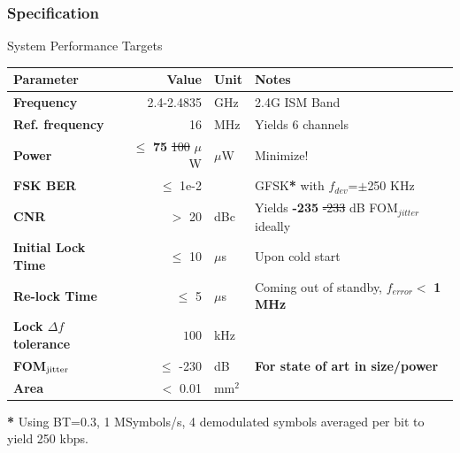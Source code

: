 \documentclass[t, screen, aspectratio=43]{beamer}
\begin{document}
\begin{frame}
	\frametitle{Specification\color{black}}
	\begin{block}{System Performance Targets}
		\tiny
		\begin{table}[h!]
			\centering
			\def\arraystretch{1.5}		
			\setlength\arrayrulewidth{0.75pt}
			\setlength{\tabcolsep}{1em} %
			\begin{tabular}{|l|r|l|l|}
				\hline 
				\rule[-1ex]{0pt}{2.5ex} \cellcolor{gray!40}\textbf{Parameter} & \cellcolor{gray!40}\textbf{Value} & \cellcolor{gray!40}\textbf{Unit }& \cellcolor{gray!40}\textbf{Notes}\\ 
				\hline 
				\rule[-1ex]{0pt}{2.5ex} \textbf{Frequency}  & 2.4-2.4835 & GHz & 2.4G ISM Band\\ 
				\hline 
				\rule[-1ex]{0pt}{2.5ex} \textbf{Ref. frequency} & 16 & MHz & Yields 6 channels \\ 
				\hline 
				\rule[-1ex]{0pt}{2.5ex} \textbf{Power} & $\leq$ \textbf{75} {\color{red}\st{100}} $\mu$W  &$\mu$W & Minimize!\\ 
				\hline 
				\rule[-1ex]{0pt}{2.5ex} \textbf{FSK BER} & $\leq$ 1e-2  & & GFSK\textbf{*} with $f_{dev}$=$\pm$250 KHz\\ 
				\hline 
				\rule[-1ex]{0pt}{2.5ex} \textbf{CNR} & $>$ 20 & dBc&Yields  \textbf{-235} {\color{red}\st{-233}} dB FOM$_{jitter}$ ideally \\ 
				\hline 
				\rule[-1ex]{0pt}{2.5ex} \textbf{Initial Lock Time} & $\leq$ 10 & $\mu$s & Upon cold start \\ 
				\hline 
				\rule[-1ex]{0pt}{2.5ex} \textbf{Re-lock Time} & $\leq$ 5 & $\mu$s & Coming out of standby, $f_{error} <$ \textbf{1 MHz} \\ 
				\hline 
				\rule[-1ex]{0pt}{2.5ex} \textbf{Lock $\Delta f$ tolerance} & $100$ & kHz& \\ 
				\hline 
				\rule[-1ex]{0pt}{2.5ex} \textbf{FOM}$_{\textnormal{jitter}}$ & $\leq$ -230 & dB & \textbf{For state of art in size/power} \\ 
				\hline 
				\rule[-1ex]{0pt}{2.5ex} \textbf{Area} & $<$ 0.01  & mm$^2$ & \\ 
				\hline 
			\end{tabular} 
		\end{table}   
		\textbf{*} Using BT=0.3, 1 MSymbols/s, 4 demodulated symbols averaged per bit to yield 250 kbps.
	\end{block}    
\end{frame}
\end{document}
